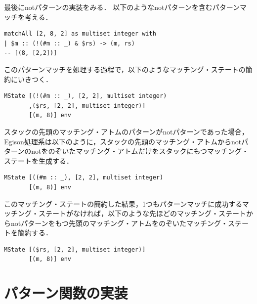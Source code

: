 最後にnotパターンの実装をみる．
以下のようなnotパターンを含むパターンマッチを考える．
\begin{lstlisting}[language=egison,numbers=none]
matchAll [2, 8, 2] as multiset integer with
| $m :: (!(#m :: _) & $rs) -> (m, rs)
-- [(8, [2,2])]
\end{lstlisting}
このパターンマッチを処理する過程で，以下のようなマッチング・ステートの簡約にいきつく．
\begin{lstlisting}[language=egison,numbers=none]
MState [(!(#m :: _), [2, 2], multiset integer)
       ,($rs, [2, 2], multiset integer)]
       [(m, 8)] env
\end{lstlisting}
スタックの先頭のマッチング・アトムのパターンがnotパターンであった場合，Egison処理系は以下のように，スタックの先頭のマッチング・アトムからnotパターンのnotをのぞいたマッチング・アトムだけをスタックにもつマッチング・ステートを生成する．
\begin{lstlisting}[language=egison,numbers=none]
MState [((#m :: _), [2, 2], multiset integer)
       [(m, 8)] env
\end{lstlisting}
このマッチング・ステートの簡約した結果，1つもパターンマッチに成功するマッチング・ステートがなければ，以下のような先ほどのマッチング・ステートからnotパターンをもつ先頭のマッチング・アトムをのぞいたマッチング・ステートを簡約する．
\begin{lstlisting}[language=egison,numbers=none]
MState [($rs, [2, 2], multiset integer)]
       [(m, 8)] env
\end{lstlisting}


\section{パターン関数の実装}\label{mechanism-pat-func}

